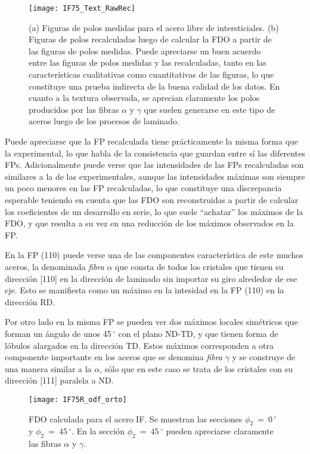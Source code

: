 \begin{figure}[!htb]
  \centering
  \texttt{[image: IF75\_Text\_RawRec]}
  \caption{(a) Figuras de polos medidas para el acero libre de intersticiales. (b) Figuras de polos recalculadas luego de calcular la FDO a partir de las figuras de polos medidas. Puede apreciarse un buen acuerdo entre las figuras de polos medidas y las recalculadas, tanto en las características cualitativas como cuantitativas de las figuras, lo que constituye una prueba indirecta de la buena calidad de los datos. En cuanto a la textura observada, se aprecian claramente los polos producidos  por las fibras $\alpha$ y $\gamma$ que suelen generarse en este tipo de aceros luego de los procesos de laminado.}
  \label{fig:IFTextRawRec}
\end{figure}

Puede apreciarse que la FP recalculada tiene prácticamente la misma forma que la experimental, lo que habla de la consistencia que guardan entre sí las diferentes FPs.
Adicionalmente puede verse que las intensidades de las FPs recalculadas son similares a la de las experimentales, aunque las intensidades máximas son siempre un poco menores en las FP recalculadas, lo que constituye una discrepancia esperable teniendo en cuenta que las FDO son reconstruidas a partir de calcular los coeficientes de un desarrollo en serie, lo que suele ``achatar'' los máximos de la FDO, y que resulta a su vez en una reducción de los máximos observados en la FP.

En la FP (110) puede verse una de las componentes característica de este muchos aceros, la denominada \textit{fibra} $\alpha$ que consta de todos los cristales que tienen su dirección [110] en la dirección de laminado sin importar su giro alrededor de ese eje. Esto se manifiesta como un máximo en la intesidad en la FP (110) en la dirección RD.

Por otro lado en la misma FP se pueden ver dos máximos locales simétricos que forman un ángulo de unos 45\,$^{\circ}$ con el plano ND-TD, y que tienen forma de lóbulos alargados en la dirección TD. 
Estos máximos corresponden a otra componente importante en los aceros que se denomina \textit{fibra} $\gamma$ y se construye de una manera similar a la $\alpha$, sólo que en este caso se trata de los cristales con su dirección [111] paralela a ND.

\begin{figure}[!htb]
  \centering
  \texttt{[image: IF75R\_odf\_orto]}
  \caption{FDO calculada para el acero IF. Se muestran las secciones $\phi_2 \ = \ 0$\,$^{\circ}$ y $\phi_2 \ = \ 45$\,$^{\circ}$. En la sección $\phi_2 \ = \ 45$\,$^{\circ}$ pueden apreciarse claramente las fibras $\alpha$ y $\gamma$.}
  \label{fig:IFODF}
\end{figure}

